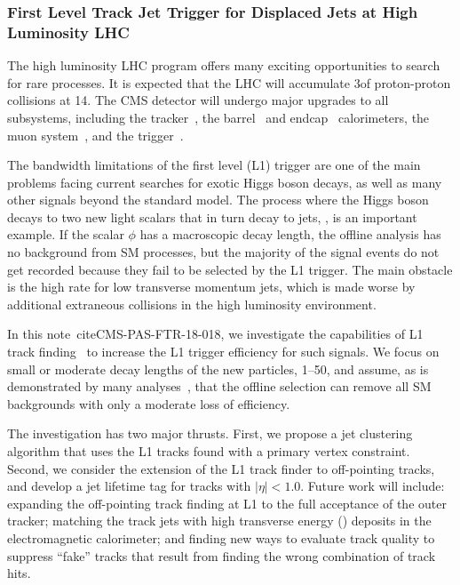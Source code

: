 \subsubsection{First Level Track Jet Trigger for Displaced Jets at High Luminosity LHC}

The high luminosity LHC program offers many exciting opportunities to search for rare processes. It is expected that the
LHC will accumulate 3\abinv of proton-proton collisions at 14\UTeV.
The CMS detector will undergo major upgrades to all subsystems, including the tracker~\cite{cmstdr-014},
the barrel~\cite{cmstdr-barrel} and endcap~\cite{cmstdr-ec} calorimeters, the muon system~\cite{cmstdr-mu},
and the trigger~\cite{cmstdr-017}. 

The bandwidth limitations of the first level (L1) trigger
are one of the main problems facing current searches 
for exotic Higgs boson decays, as well as many other signals beyond the standard model.
The process where the Higgs boson decays to two new light scalars that in turn decay to jets, \Hphiphi, is an important example. If the scalar $\phi$ has a
macroscopic decay length, the offline analysis has no background from SM processes, but the majority of the signal events do not get recorded because they fail to be selected by the L1 trigger.
The main obstacle is the high rate for low transverse momentum jets, which is made worse by additional extraneous \pp collisions in the
high luminosity environment.

In this note~cite{CMS-PAS-FTR-18-018}, we investigate the capabilities of L1 track finding~\cite{cmstdr-014} to increase the L1 trigger efficiency for such signals.
We focus on small or moderate decay lengths of the new particles, 1--50\Umm, and assume, as is demonstrated by
many analyses~\cite{ll1, ll2, ll3}, that the offline selection can remove all SM backgrounds with only a moderate loss of efficiency.

The investigation has two major thrusts. First, we propose a jet clustering algorithm that uses the L1 tracks found with a primary vertex constraint.
Second, we consider the extension of the L1
track finder to off-pointing tracks, and develop a jet lifetime tag for tracks with $|\eta| < 1.0$. 
Future work will include: expanding the off-pointing track finding at L1 to the full acceptance of the outer tracker;
matching the track jets with high transverse energy (\ET) deposits in the electromagnetic calorimeter; and finding new ways to evaluate
track quality to suppress ``fake'' tracks that result from finding the wrong combination of track hits. 

